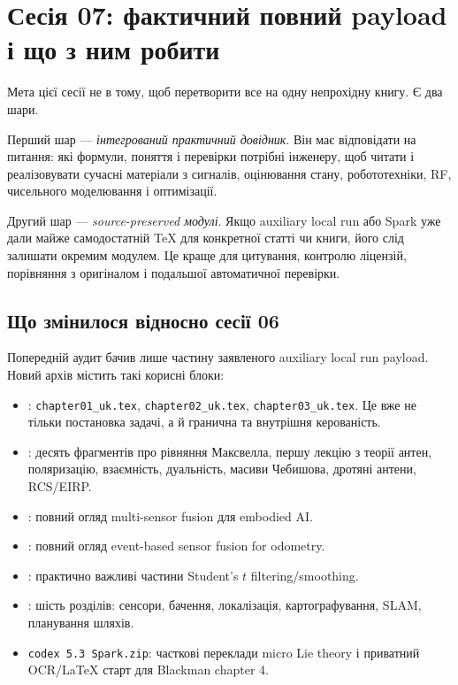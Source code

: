 \chapter{Сесія 07: фактичний повний payload і що з ним робити}
\label{chap:session07-payload}


Мета цієї сесії не в тому, щоб перетворити все на одну непрохідну книгу. Є два шари.

Перший шар --- \emph{інтегрований практичний довідник}. Він має відповідати на питання: які формули, поняття і перевірки потрібні інженеру, щоб читати і реалізовувати сучасні матеріали з сигналів, оцінювання стану, робототехніки, RF, чисельного моделювання і оптимізації.

Другий шар --- \emph{source-preserved модулі}. Якщо auxiliary local run або Spark уже дали майже самодостатній TeX для конкретної статті чи книги, його слід залишати окремим модулем. Це краще для цитування, контролю ліцензій, порівняння з оригіналом і подальшої автоматичної перевірки.

\section{Що змінилося відносно сесії 06}

Попередній аудит бачив лише частину заявленого auxiliary local run payload. Новий архів містить такі корисні блоки:
\begin{itemize}[leftmargin=*]
\item {}: \texttt{chapter01\_uk.tex}, \texttt{chapter02\_uk.tex}, \texttt{chapter03\_uk.tex}. Це вже не тільки постановка задачі, а й гранична та внутрішня керованість.
\item {}: десять фрагментів про рівняння Максвелла, першу лекцію з теорії антен, поляризацію, взаємність, дуальність, масиви Чебишова, дротяні антени, RCS/EIRP.
\item {}: повний огляд multi-sensor fusion для embodied AI.
\item {}: повний огляд event-based sensor fusion for odometry.
\item {}: практично важливі частини Student's $t$ filtering/smoothing.
\item {}: шість розділів: сенсори, бачення, локалізація, картографування, SLAM, планування шляхів.
\item \texttt{codex 5.3 Spark.zip}: часткові переклади micro Lie theory і приватний OCR/LaTeX старт для Blackman chapter 4.
\end{itemize}

